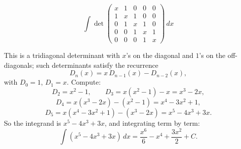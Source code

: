 \begin{questions}
\question
\[ \int \det\begin{pmatrix} x&1&0&0&0\\1&x&1&0&0\\0&1&x&1&0\\0&0&1&x&1\\0&0&0&1&x \end{pmatrix} \, dx \]
\begin{solution}
This is a tridiagonal determinant with $x$'s on the diagonal and $1$'s on the off-diagonals; such determinants satisfy the recurrence
\[ D_n(x) = x\,D_{n-1}(x) - D_{n-2}(x), \]
with $D_0 = 1$, $D_1 = x$. Compute:
\[ D_2 = x^2 - 1, \qquad D_3 = x(x^2-1) - x = x^3 - 2x, \]
\[ D_4 = x(x^3-2x) - (x^2-1) = x^4 - 3x^2 + 1, \]
\[ D_5 = x(x^4-3x^2+1) - (x^3-2x) = x^5 - 4x^3 + 3x. \]
So the integrand is $x^5 - 4x^3 + 3x$, and integrating term by term:
\[ \int (x^5 - 4x^3 + 3x)\,dx = \frac{x^6}{6} - x^4 + \frac{3x^2}{2} + C. \]
\end{solution}

\end{questions}

